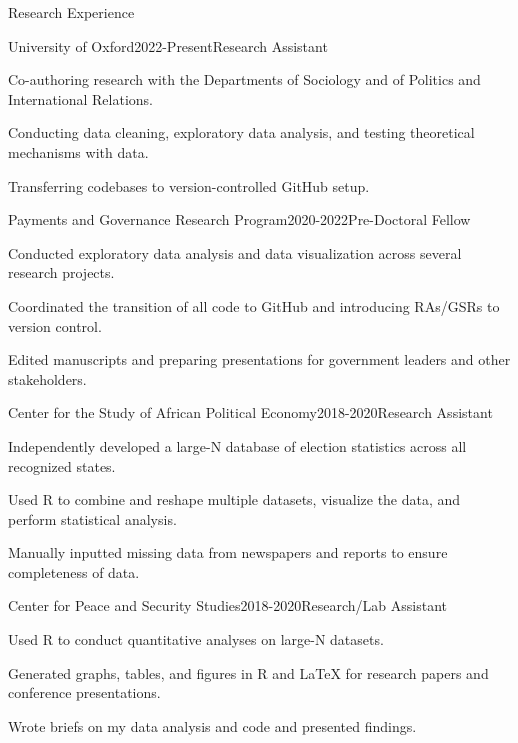 \documentclass[10pt]{resume} %
\begin{document}
	\begin{rSection}{Research Experience}
		
		\begin{rSubsection}{University of Oxford}{2022-Present}{Research Assistant}{}
		\item Co-authoring research with the Departments of Sociology and of Politics and International Relations.
		\item Conducting data cleaning, exploratory data analysis, and testing theoretical mechanisms with data.
		\item Transferring codebases to version-controlled GitHub setup.
		\end{rSubsection}
		
		\begin{rSubsection}{Payments and Governance Research Program}{2020-2022}{Pre-Doctoral Fellow}{}
		\item Conducted exploratory data analysis and data visualization across several research projects.
		\item Coordinated the transition of all code to GitHub and introducing RAs/GSRs to version control. 
		\item Edited manuscripts and preparing presentations for government leaders and other stakeholders.
		\end{rSubsection}
		
		\begin{rSubsection}{Center for the Study of African Political Economy}{2018-2020}{Research Assistant}{}
		\item Independently developed a large-N database of election statistics across all recognized states.
		\item Used R to combine and reshape multiple datasets, visualize the data, and perform statistical analysis.
		\item Manually inputted missing data from newspapers and reports to ensure completeness of data. 
		\end{rSubsection}
		
		\begin{rSubsection}{Center for Peace and Security Studies}{2018-2020}{Research/Lab Assistant}{}
		\item Used R to conduct quantitative analyses on large-N datasets.
		\item Generated graphs, tables, and figures in R and LaTeX for research papers and conference presentations.
		\item Wrote briefs on my data analysis and code and presented findings. 
			
		\end{rSubsection}
		
	\end{rSection}
		
\end{document}
